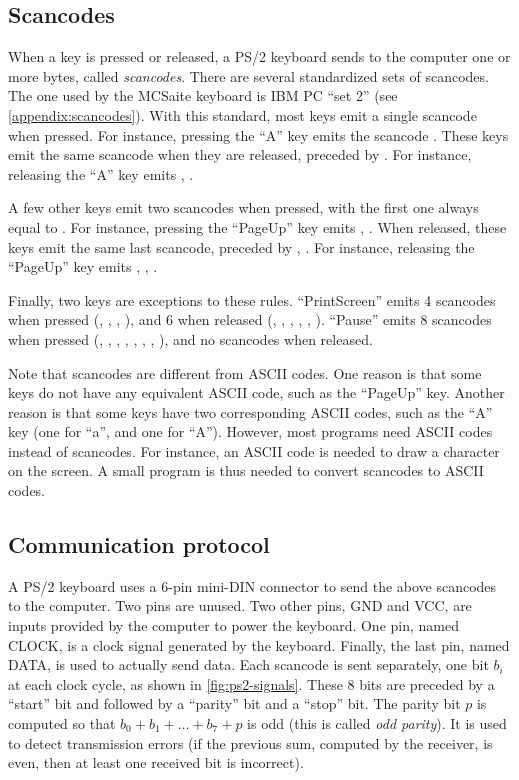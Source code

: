 \subsection{Scancodes}\label{subsection:scancodes}

When a key is pressed or released, a PS/2 keyboard sends to the computer one or
more bytes, called {\em scancodes}. There are several standardized sets of
scancodes. The one used by the MCSaite keyboard is IBM PC ``set 2'' (see
\cref{appendix:scancodes}). With this standard, most keys emit a single
scancode when pressed. For instance, pressing the ``A'' key emits
the scancode . These keys emit the same scancode when they are
released, preceded by . For instance, releasing the ``A'' key emits
, .

A few other keys emit two scancodes when pressed, with the first one always
equal to . For instance, pressing the ``PageUp'' key emits ,
. When released, these keys emit the same last scancode, preceded by
, . For instance, releasing the ``PageUp'' key emits
, , .

Finally, two keys are exceptions to these rules. ``PrintScreen'' emits 4
scancodes when pressed (, , , ), and 6 when
released (, , , , , ).
``Pause'' emits 8 scancodes when pressed (, , ,
, , , , ), and no scancodes when
released.

Note that scancodes are different from ASCII codes. One reason is that some
keys do not have any equivalent ASCII code, such as the ``PageUp'' key. Another
reason is that some keys have two corresponding ASCII codes, such as the ``A''
key (one for ``a'', and one for ``A''). However, most programs need ASCII codes
instead of scancodes. For instance, an ASCII code is needed to draw a character
on the screen. A small program is thus needed to convert scancodes to ASCII
codes.

\subsection{Communication protocol}\label{subsection:ps2}

A PS/2 keyboard uses a 6-pin mini-DIN connector to send the above scancodes to
the computer. Two pins are unused. Two other pins, GND and VCC, are inputs
provided by the computer to power the keyboard. One pin, named CLOCK, is a
clock signal generated by the keyboard. Finally, the last pin, named DATA, is
used to actually send data. Each scancode is sent separately, one bit $b_i$ at
each clock cycle, as shown in \cref{fig:ps2-signals}. These 8 bits are preceded
by a ``start'' bit and followed by a ``parity'' bit and a ``stop'' bit. The
parity bit $p$ is computed so that $b_0+b_1+\ldots+b_7+p$ is odd (this is
called {\em odd parity}). It is used to detect transmission errors (if the
previous sum, computed by the receiver, is even, then at least one received bit
is incorrect).

